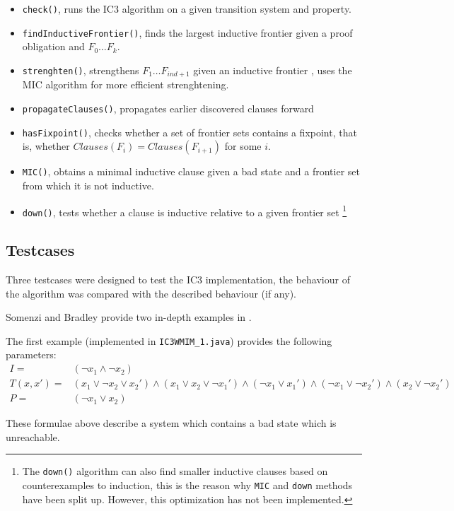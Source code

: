 \documentclass[a4paper]{article}
\begin{document}
\begin{itemize}
\item \texttt{check()}, runs the IC3 algorithm on a given transition system and property.
\item \texttt{findInductiveFrontier()}, finds the largest inductive frontier given a proof obligation and $F_0 \ldots F_k$.
\item \texttt{strenghten()}, strengthens $F_1 \ldots F_{ind+1}$ given an inductive frontier	, uses the MIC algorithm for more efficient strenghtening.
\item \texttt{propagateClauses()}, propagates earlier discovered clauses forward
\item \texttt{hasFixpoint()}, checks whether a set of frontier sets contains a fixpoint, that is, whether $Clauses(F_i) = Clauses(F_{i+1})$ for some $i$.
\item \texttt{MIC()}, obtains a minimal inductive clause given a bad state and a frontier set from which it is not inductive.
\item \texttt{down()}, tests whether a clause is inductive relative to a given frontier set \footnote{The \texttt{down()} algorithm can also find smaller inductive clauses based on counterexamples to induction, this is the reason why \texttt{MIC} and \texttt{down} methods have been split up. However, this optimization has not been implemented.}
\end{itemize}

\subsection{Testcases}
\label{sec:ic3_testcases}
Three testcases were designed to test the IC3 implementation, the behaviour of the algorithm was compared with the described behaviour (if any).

Somenzi and Bradley provide two in-depth examples in \cite{Somenzi2011}.

The first example (implemented in \texttt{IC3WMIM\_1.java}) provides the following parameters:
\begin{align*}
I =& (\lnot x_1 \land \lnot x_2)\\
T(x,x') =& (x_1 \lor \lnot x_2 \lor x_2') \land (x_1 \lor x_2 \lor \lnot x_1') \land (\lnot x_1 \lor x_1') \land (\lnot x_1 \lor \lnot x_2') \land (x_2 \lor \lnot x_2') \\
P =& (\lnot x_1 \lor x_2)
\end{align*}

These formulae above describe a system which contains a bad state which is unreachable.
\end{document}
